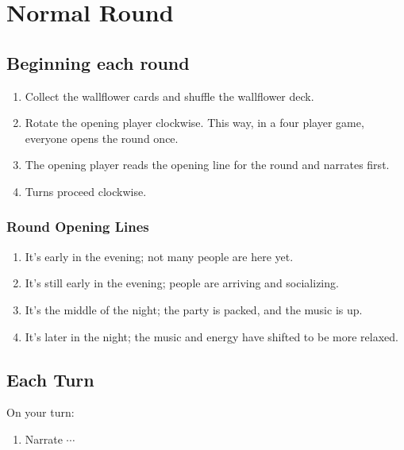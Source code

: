 \documentclass[letterpaper, 12pt]{article}
\newcommand{\vsymbolref}{$\cdots$}
\newcommand{\vlinkrefsectionpartynarrate}{section:partynarrate}
\newcommand{\vlinkrefsectionpartynormalround}{section:partynormalround}
\newcommand{\clinkref}[1]{\label{#1}}
\newcommand{\clink}[1]{\hyperref[#1]{\vsymbolref}}
\begin{document}
{\pagebreak
\section{Normal Round} \clinkref{\vlinkrefsectionpartynormalround}


\subsection{Beginning each round}

\begin{enumerate}
	\item Collect the wallflower cards and shuffle the wallflower deck.
	\item Rotate the opening player clockwise. This way, in a four player game, everyone opens the round once.
	\item The opening player reads the opening line for the round and narrates first.
	\item Turns proceed clockwise.
	
\end{enumerate}

\subsubsection{Round Opening Lines}

\begin{enumerate}
	\renewcommand{\labelenumi}{\Roman{enumi}.}
	\item It's early in the evening; not many people are here yet.
	
	\item It's still early in the evening; people are arriving and socializing.

	\item It's the middle of the night; the party is packed, and the music is up.
	
	\item It's later in the night; the music and energy have shifted to be more relaxed.
\end{enumerate}

\pagebreak
\subsection{Each Turn}

On your turn:

\begin{enumerate}[leftmargin=*]
	\item Narrate \clink{\vlinkrefsectionpartynarrate}


\end{enumerate}}
\end{document}
